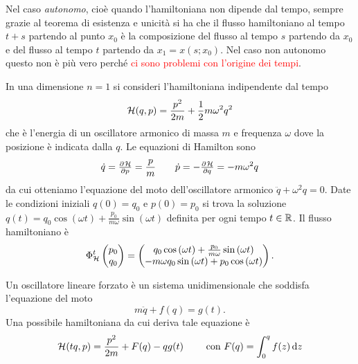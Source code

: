 Nel caso \emph{autonomo}, cioè quando l'hamiltoniana non dipende dal tempo, sempre grazie al teorema di esistenza e unicità si ha che il flusso hamiltoniano al tempo $ t+s $ partendo al punto $ x_0 $ è la composizione del flusso al tempo $ s $ partendo da $ x_0 $ e del flusso al tempo $ t $ partendo da $ x_1 = x(s; x_0) $. Nel caso non autonomo questo non è più vero perché \textcolor{red}{ci sono problemi con l'origine dei tempi}.

\begin{example}
    In una dimensione $ n = 1 $ si consideri l'hamiltoniana indipendente dal tempo
    \[
        \mathcal{H}(q, p) = \frac{p^2}{2m} + \frac{1}{2} m \omega^2 q^2
    \]
    che è l'energia di un oscillatore armonico di massa $ m $ e frequenza $ \omega $ dove la posizione è indicata dalla $ q $. Le equazioni di Hamilton sono
    \[
        \dot{q} = \pd{\ham}{p} = \frac{p}{m} \qquad \dot{p} = -\pd{\ham}{q} = -m\omega^2 q
    \]
    da cui otteniamo l'equazione del moto dell'oscillatore armonico $ \ddot{q} + \omega^2 q = 0 $. Date le condizioni iniziali $ q(0) = q_0 $ e $ p(0) = p_0 $ si trova la soluzione $ q(t) = q_0 \cos{(\omega t)} + \frac{p_0}{m\omega} \sin{(\omega t)} $ definita per ogni tempo $ t \in \mathbb{R} $. Il flusso hamiltoniano è
    \[
        \Phi^t_{\mathcal{H}}
        \begin{pmatrix}
        p_0 \\
        q_0
        \end{pmatrix}
        =
        \begin{pmatrix}
        q_0 \cos{(\omega t)} + \frac{p_0}{m\omega} \sin{(\omega t)} \\
        -m \omega q_0 \sin{(\omega t)} + p_0\cos{(\omega t)}
        \end{pmatrix}.
    \]
\end{example}

\begin{example}
    Un oscillatore lineare forzato è un sistema unidimensionale che soddisfa l'equazione del moto
    \[
        m\ddot{q} + f(q) = g(t).
    \]
    Una possibile hamiltoniana da cui deriva tale equazione è
    \[
        \ham(t q, p) = \frac{p^2}{2m} + F(q) - q g(t) \qquad \text{ con } F(q) = \int_0^q f(z) \dif{z}
    \]
\end{example}

